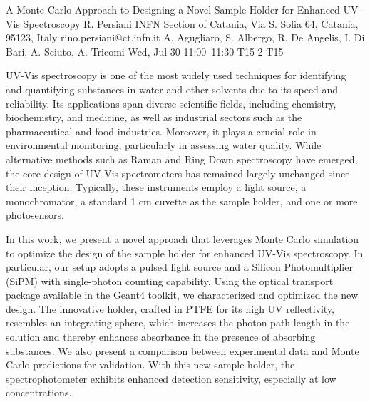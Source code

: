 \begin{talk}
  {A Monte Carlo Approach to Designing a Novel Sample Holder for Enhanced UV-Vis Spectroscopy}%
  {R. Persiani}%
  {INFN Section of Catania, Via S. Sofia 64, Catania, 95123, Italy}%
  {rino.persiani@ct.infn.it}%
  {A. Agugliaro, S. Albergo, R. De Angelis, I. Di Bari, A. Sciuto, A. Tricomi}%
  {}%
  {Wed, Jul 30 11:00–11:30}%
  {T15-2}%
  {T15}%
  
				
			
UV-Vis spectroscopy is one of the most widely used techniques for identifying and quantifying substances in water and other solvents due to its speed and reliability. Its applications span diverse scientific fields, including chemistry, biochemistry, and medicine, as well as industrial sectors such as the pharmaceutical and food industries. Moreover, it plays a crucial role in environmental monitoring, particularly in assessing water quality. While alternative methods such as Raman and Ring Down spectroscopy have emerged, the core design of UV-Vis spectrometers has remained largely unchanged since their inception. Typically, these instruments employ a light source, a monochromator, a standard 1 cm cuvette as the sample holder, and one or more photosensors.

In this work, we present a novel approach that leverages Monte Carlo simulation to optimize the design of the sample holder for enhanced UV-Vis spectroscopy. In particular, our setup adopts a pulsed light source and a Silicon Photomultiplier (SiPM) with single-photon counting capability. Using the optical transport package available in the Geant4 toolkit, we characterized and optimized the new design. The innovative holder, crafted in PTFE for its high UV reflectivity, resembles an integrating sphere, which increases the photon path length in the solution and thereby enhances absorbance in the presence of absorbing substances. We also present a comparison between experimental data and Monte Carlo predictions for validation. With this new sample holder, the spectrophotometer exhibits enhanced detection sensitivity, especially at low concentrations.

\medskip

\end{talk}

